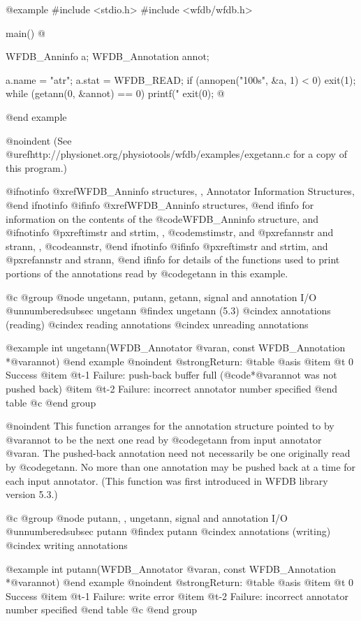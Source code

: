 {{{{{{{{@example
#include <stdio.h>
#include <wfdb/wfdb.h>

main()
@{
    WFDB_Anninfo a;
    WFDB_Annotation annot;

    a.name = "atr"; a.stat = WFDB_READ;
    if (annopen("100s", &a, 1) < 0)
        exit(1);
    while (getann(0, &annot) == 0)
        printf("%
    exit(0);
@}
@end example

@noindent
(See @uref{http://physionet.org/physiotools/wfdb/examples/exgetann.c}
for a copy of this program.)

@ifnotinfo
@xref{WFDB_Anninfo structures, , Annotator Information Structures},
@end ifnotinfo
@ifinfo
@xref{WFDB_Anninfo structures},
@end ifinfo
for information on the contents of the @code{WFDB_Anninfo} structure,
and
@ifnotinfo
@pxref{timstr and strtim, , @code{mstimstr}}, and
@pxref{annstr and strann, , @code{annstr}},
@end ifnotinfo
@ifinfo
@pxref{timstr and strtim}, and @pxref{annstr and strann},
@end ifinfo
for details of the functions used to print portions of the annotations
read by @code{getann} in this example.

@c @group
@node     ungetann, putann, getann, signal and annotation I/O
@unnumberedsubsec ungetann
@findex ungetann (5.3)
@cindex annotations (reading)
@cindex reading annotations
@cindex unreading annotations

@example
int ungetann(WFDB_Annotator @var{an}, const WFDB_Annotation *@var{annot})
@end example
@noindent
@strong{Return:}
@table @asis
@item @t{ 0}
Success
@item @t{-1}
Failure: push-back buffer full (@code{*@var{annot}} was not pushed back)
@item @t{-2}
Failure: incorrect annotator number specified
@end table
@c @end group

@noindent
This function arranges for the annotation structure pointed to by
@var{annot} to be the next one read by @code{getann} from input
annotator @var{an}.  The pushed-back annotation need not necessarily be
one originally read by @code{getann}.  No more than one annotation may
be pushed back at a time for each input annotator.  (This function was
first introduced in WFDB library version 5.3.)

@c @group
@node     putann, , ungetann, signal and annotation I/O
@unnumberedsubsec putann
@findex putann
@cindex annotations (writing)
@cindex writing annotations

@example
int putann(WFDB_Annotator @var{an}, const WFDB_Annotation *@var{annot})
@end example
@noindent
@strong{Return:}
@table @asis
@item @t{ 0}
Success
@item @t{-1}
Failure: write error
@item @t{-2}
Failure: incorrect annotator number specified
@end table
@c @end group

}}}}}}}}
